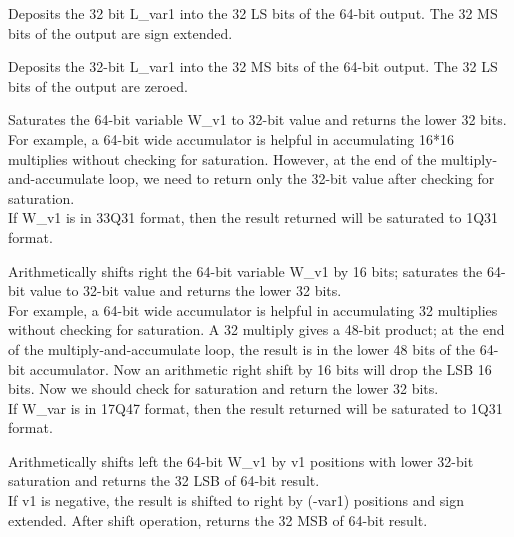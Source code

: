 
Deposits the 32 bit L\_var1 into the 32 LS bits of the 64-bit output. The 32 MS bits of the output are sign extended.


Deposits the 32-bit L\_var1 into the 32 MS bits of the 64-bit output. The 32 LS bits of the output are zeroed.


Saturates the 64-bit variable W\_v1 to 32-bit value and returns the lower 32 bits.\\
For example, a 64-bit wide accumulator is helpful in accumulating 16*16 multiplies without checking for saturation.
However, at the end of the multiply-and-accumulate loop, we need to return only the 32-bit value after checking for saturation.\\
If W\_v1 is in 33Q31 format, then the result returned will be saturated to 1Q31 format.


Arithmetically shifts right the 64-bit variable W\_v1 by 16 bits; saturates the 64-bit value to 32-bit value and returns the lower 32 bits.\\
For example, a 64-bit wide accumulator is helpful in accumulating 32 multiplies without checking for saturation.
A 32 multiply gives a 48-bit product; at the end of the multiply-and-accumulate loop, the result is in the lower 48 bits of the 64-bit accumulator.
Now an arithmetic right shift by 16 bits will drop the LSB 16 bits.
Now we should check for saturation and return the lower 32 bits.\\
If W\_var is in 17Q47 format, then the result returned will be saturated to 1Q31 format.


Arithmetically shifts left the 64-bit W\_v1 by v1 positions with lower 32-bit saturation and returns the 32 LSB of 64-bit result.\\
If v1 is negative, the result is shifted to right by (-var1) positions and sign extended.
After shift operation, returns the 32 MSB of 64-bit result.

